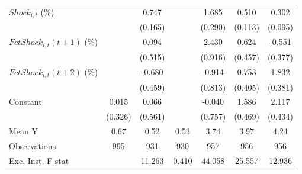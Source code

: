 {\begin{tabular}{l*{6}{c}}
\addlinespace
$ Shock_{i,t}$ (\%) &                     &       0.747\sym{***}&                     &       1.685\sym{***}&       0.510\sym{***}&       0.302\sym{***}\\
                    &                     &     (0.165)         &                     &     (0.290)         &     (0.113)         &     (0.095)         \\
\addlinespace
$ FctShock_{i,t}(t+1)$ (\%)&                     &       0.094         &                     &       2.430\sym{**} &       0.624         &      -0.551         \\
                    &                     &     (0.515)         &                     &     (0.916)         &     (0.457)         &     (0.377)         \\
\addlinespace
$ FctShock_{i,t}(t+2)$ (\%)&                     &      -0.680         &                     &      -0.914         &       0.753\sym{*}  &       1.832\sym{***}\\
                    &                     &     (0.459)         &                     &     (0.813)         &     (0.405)         &     (0.381)         \\
\addlinespace
Constant            &       0.015         &       0.066         &                     &      -0.040         &       1.586\sym{***}&       2.117\sym{***}\\
                    &     (0.326)         &     (0.561)         &                     &     (0.757)         &     (0.469)         &     (0.434)         \\
\midrule
Mean Y              &        0.67         &        0.52         &        0.53         &        3.74         &        3.97         &        4.24         \\
Observations        &         995         &         931         &         930         &         957         &         956         &         956         \\
Exc. Inst. F-stat   &                     &      11.263         &       0.410         &      44.058         &      25.557         &      12.936         \\
\bottomrule
\end{tabular}
}

